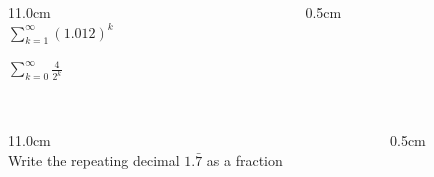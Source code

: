 \begin{frame}
\frametitle{}
\scriptsize

\vspace{0.2cm}

\begin{columns}
\begin{column}{11.0cm}
\\

$\displaystyle{\sum \limits_{k = 1}^{\infty} (1.012)^k}$

\vspace{4.0cm}

$\displaystyle{\sum \limits_{k = 0}^{\infty} \frac{4}{2^k}}$

\vspace{6.5cm}

\end{column}
\begin{column}{0.5cm}
	
\end{column}
\end{columns}
\end{frame}

\begin{frame}
\frametitle{}
\scriptsize

\vspace{0.2cm}

\begin{columns}
\begin{column}{11.0cm}
\\

Write the repeating decimal $1.\bar{7}$ as a fraction\\

\vspace{10.5cm}

\end{column}
\begin{column}{0.5cm}
	
\end{column}
\end{columns}
\end{frame}


